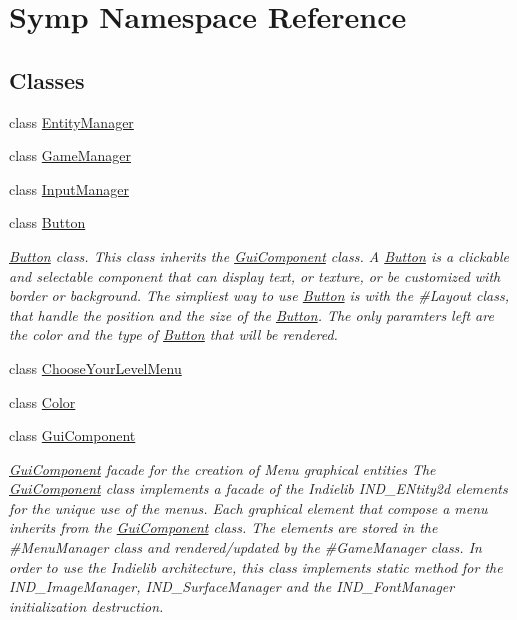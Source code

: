 \hypertarget{namespace_symp}{\section{Symp Namespace Reference}
\label{namespace_symp}
}
\subsection*{Classes}
\begin{DoxyCompactItemize}
\item 
class \hyperlink{class_symp_1_1_entity_manager}{Entity\-Manager}
\item 
class \hyperlink{class_symp_1_1_game_manager}{Game\-Manager}
\item 
class \hyperlink{class_symp_1_1_input_manager}{Input\-Manager}
\item 
class \hyperlink{class_symp_1_1_button}{Button}
\begin{DoxyCompactList}\small\item\em \hyperlink{class_symp_1_1_button}{Button} class. This class inherits the \hyperlink{class_symp_1_1_gui_component_a22124675c2976983ac18374f81cc3fb3}{Gui\-Component} class. A \hyperlink{class_symp_1_1_button_a2de1604451d582a7c2e22344305212e5}{Button} is a clickable and selectable component that can display text, or texture, or be customized with border or background. The simpliest way to use \hyperlink{class_symp_1_1_button_a2de1604451d582a7c2e22344305212e5}{Button} is with the \#\-Layout class, that handle the position and the size of the \hyperlink{class_symp_1_1_button_a2de1604451d582a7c2e22344305212e5}{Button}. The only paramters left are the color and the type of \hyperlink{class_symp_1_1_button_a2de1604451d582a7c2e22344305212e5}{Button} that will be rendered. \end{DoxyCompactList}\item 
class \hyperlink{class_symp_1_1_choose_your_level_menu}{Choose\-Your\-Level\-Menu}
\item 
class \hyperlink{struct_symp_1_1_color}{Color}
\item 
class \hyperlink{class_symp_1_1_gui_component}{Gui\-Component}
\begin{DoxyCompactList}\small\item\em \hyperlink{class_symp_1_1_gui_component}{Gui\-Component} facade for the creation of Menu graphical entities The \hyperlink{class_symp_1_1_gui_component}{Gui\-Component} class implements a facade of the Indielib I\-N\-D\-\_\-\-E\-Ntity2d elements for the unique use of the menus. Each graphical element that compose a menu inherits from the \hyperlink{class_symp_1_1_gui_component}{Gui\-Component} class. The elements are stored in the \#\-Menu\-Manager class and rendered/updated by the \#\-Game\-Manager class. In order to use the Indielib architecture, this class implements static method for the I\-N\-D\-\_\-\-Image\-Manager, I\-N\-D\-\_\-\-Surface\-Manager and the I\-N\-D\-\_\-\-Font\-Manager initialization destruction. \end{DoxyCompactList}\item 

\end{DoxyCompactItemize}
